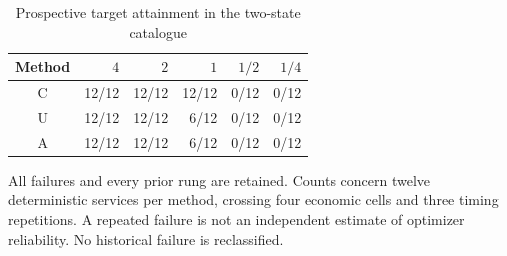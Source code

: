 \begin{table}[htbp]
\centering
\caption{Prospective target attainment in the two-state catalogue}\label{tab:attainment48}
\footnotesize
\begin{tabular}{crrrrr}
\toprule
Method & $4$ & $2$ & $1$ & $1/2$ & $1/4$\\
\midrule
C & 12/12 & 12/12 & 12/12 & 0/12 & 0/12 \\
U & 12/12 & 12/12 & 6/12 & 0/12 & 0/12 \\
A & 12/12 & 12/12 & 6/12 & 0/12 & 0/12 \\
\bottomrule
\end{tabular}
\begin{minipage}{0.97\linewidth}\footnotesize\vspace{3pt}
All failures and every prior rung are retained. Counts concern twelve deterministic services per method, crossing four economic cells and three timing repetitions. A repeated failure is not an independent estimate of optimizer reliability. No historical failure is reclassified.
\end{minipage}
\end{table}
